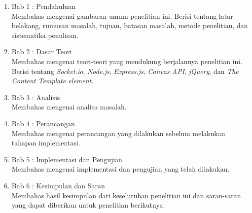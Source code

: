 \begin{enumerate}
	\item Bab 1 : Pendahuluan \\
	Membahas mengenai gambaran umum penelitian ini. Berisi tentang latar belakang, rumusan masalah, tujuan, batasan masalah, metode penelitian, dan sistematika penulisan.
	
	\item Bab 2 : Dasar Teori \\
	Membahas mengenai teori-teori yang mendukung berjalannya penelitian ini. Berisi tentang \textit{Socket.io}, \textit{Node.js},  \textit{Express.js}, \textit{Canvas API}, \textit{jQuery}, dan \textit{The Content Template element}.
	
	\item Bab 3 : Analisis \\
	Membahas mengenai analisa masalah.
	
	\item Bab 4 : Perancangan \\
	Membahas mengenai perancangan yang dilakukan sebelum melakukan tahapan implementasi.
	
	\item Bab 5 : Implementasi dan Pengujian \\
	Membahas mengenai implementasi dan pengujian yang telah dilakukan.
	
	\item Bab 6 : Kesimpulan dan Saran \\
	Membahas hasil kesimpulan dari keseluruhan penelitian ini dan saran-saran yang dapat diberikan untuk penelitian berikutnya.
\end{enumerate}